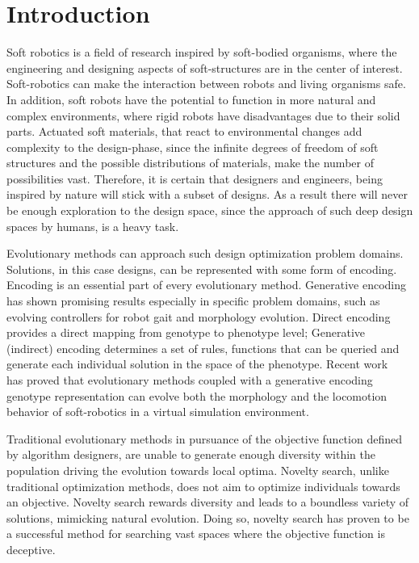 
\chapter{Introduction} %

\label{Chapter1} %


Soft robotics is a field of research inspired by soft-bodied organisms, where the engineering and designing aspects of soft-structures are in the center of interest. Soft-robotics can make the interaction between robots and living organisms safe. In addition, soft robots have the potential to function in more natural and  complex environments, where rigid robots have disadvantages due to their solid parts. Actuated soft materials, that react to environmental changes add complexity to the design-phase, since the infinite degrees of freedom of soft structures and the possible distributions of materials, make the number of possibilities vast. Therefore, it is certain that designers and engineers, being inspired by nature will stick with a subset of designs. As a result there will never be enough exploration to the design space, since the approach of such deep design spaces by humans, is a heavy task.

Evolutionary methods can approach such design optimization problem domains. Solutions, in this case designs, can be represented with some form of encoding. Encoding is an essential part of every evolutionary method. Generative encoding has shown promising results especially in specific problem domains, such as evolving controllers for robot gait and morphology evolution. Direct encoding provides a direct mapping from genotype to phenotype level; Generative (indirect) encoding determines a set of rules, functions that can be queried and generate each individual solution in the space of the phenotype. Recent work~\citep{cheney2013unshackling} has proved that evolutionary methods coupled with a generative encoding genotype representation can evolve both the morphology and the locomotion behavior of soft-robotics in a virtual simulation environment.

Traditional evolutionary methods in pursuance of the objective function defined by algorithm designers, are unable to generate enough diversity within the population driving the evolution towards local optima. Novelty search, unlike traditional optimization methods, does not aim to optimize individuals towards an objective. Novelty search rewards diversity and leads to a boundless variety of solutions, mimicking natural evolution. Doing so, novelty search has proven to be a successful method for searching vast spaces where the objective function is deceptive.

